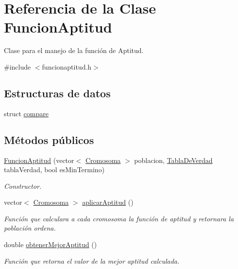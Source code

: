 \hypertarget{classFuncionAptitud}{\section{Referencia de la Clase Funcion\-Aptitud}
\label{classFuncionAptitud}
}


Clase para el manejo de la función de Aptitud.  




{\ttfamily \#include $<$funcionaptitud.\-h$>$}

\subsection*{Estructuras de datos}
\begin{DoxyCompactItemize}
\item 
struct \hyperlink{structFuncionAptitud_1_1compare}{compare}
\end{DoxyCompactItemize}
\subsection*{Métodos públicos}
\begin{DoxyCompactItemize}
\item 
\hyperlink{classFuncionAptitud_a7e6eb419f2c5c754e96cc93ecebac0e3}{Funcion\-Aptitud} (vector$<$ \hyperlink{classCromosoma}{Cromosoma} $>$ poblacion, \hyperlink{classTablaDeVerdad}{Tabla\-De\-Verdad} tabla\-Verdad, bool es\-Min\-Termino)
\begin{DoxyCompactList}\small\item\em Constructor. \end{DoxyCompactList}\item 
vector$<$ \hyperlink{classCromosoma}{Cromosoma} $>$ \hyperlink{classFuncionAptitud_a45c1cdc83e08ba9b26a2f95fc49523f1}{aplicar\-Aptitud} ()
\begin{DoxyCompactList}\small\item\em Función que calculara a cada cromosoma la función de aptitud y retornara la población ordena. \end{DoxyCompactList}\item 
double \hyperlink{classFuncionAptitud_a4719bc3182eeba62dd27a595f659ee8c}{obtener\-Mejor\-Aptitud} ()
\begin{DoxyCompactList}\small\item\em Función que retorna el valor de la mejor aptitud calculada. \end{DoxyCompactList}\end{DoxyCompactItemize}


